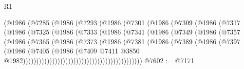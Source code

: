 \begin{lexlean}{R1}
\begin{coremodule}
                          (@1986
                            (@7285
                              (@1986
                                (@7293
                                  (@1986
                                    (@7301
                                      (@1986
                                        (@7309
                                          (@1986
                                            (@7317
                                              (@1986
                                                (@7325
                                                  (@1986
                                                    (@7333
                                                      (@1986
                                                        (@7341
                                                          (@1986
                                                            (@7349
                                                              (@1986
                                                                (@7357
                                                                  (@1986
                                                                    (@7365
                                                                      (@1986
                                                                        (@7373
                                                                          (@1986
                                                                            (@7381
                                                                              (@1986
                                                                                (@7389
                                                                                  (@1986
                                                                                    (@7397
                                                                                      (@1986
                                                                                        (@7405
                                                                                          (@1986
                                                                                            (@7409
                                                                                              @7411
                                                                                              @3850
                                                                                              @1982)))))))))))))))))))))))))))))))))))))))))))))
@7602 := @7171

\end{coremodule}
\end{lexlean}

